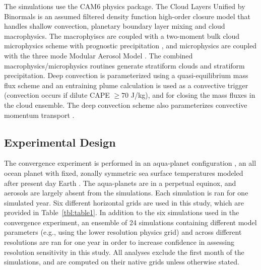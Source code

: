 \documentclass[times]{qjrms4}
\begin{document}
The simulations use the CAM6 physics package. The Cloud Layers Unified by Binormals \citep[CLUBB][]{GETAL2002JAS,BOG2013JCLIM} is an assumed filtered density function \citep{G1992JFM} high-order closure model that handles shallow convection, planetary boundary layer mixing and cloud macrophysics. The macrophyiscs are coupled with a two-moment bulk cloud microphysics scheme with prognostic precipitation \citep{MG2}, and microphysics are coupled with the three mode Modular Aerosol Model \citep{MAM}. The combined macrophysics/microphysics routines generate stratiform clouds and stratiform precipitation. Deep convection is parameterized using a quasi-equilibrium mass flux scheme \citep{ZM1995AO} and an entraining plume calculation \citep[referred to as the dilute convective available potential energy, or {\em{dilute CAPE}} hereafter;][]{RB1992JAS, NRJ2008JC} is used as a convective trigger (convection occurs if dilute CAPE $\geq 70$ J/kg), and for closing the mass fluxes in the cloud ensemble. The deep convection scheme also parameterizes convective momentum transport \citep{RR2008JC}.

\subsection{Experimental Design}

The convergence experiment is performed in an aqua-planet configuration \citep{NH2000ASL,MWO2016JAMES}, an all ocean planet with fixed, zonally symmetric sea surface temperatures modeled after present day Earth \citep[$QOBS$ in][]{NH2000ASL}. The aqua-planets are in a perpetual equinox, and aerosols are largely absent from the simulations. Each simulation is ran for one simulated year. Six different horizontal grids are used in this study, which are provided in Table~\ref{tbl:table1}. In addition to the six simulations used in the convergence experiment, an ensemble of 24 simulations containing different model parameters (e.g., using the lower resolution physics grid) and across different resolutions are ran for one year in order to increase confidence in assessing resolution sensitivity in this study. All analyses exclude the first month of the simulations, and are computed on their native grids unless otherwise stated.
\end{document}
